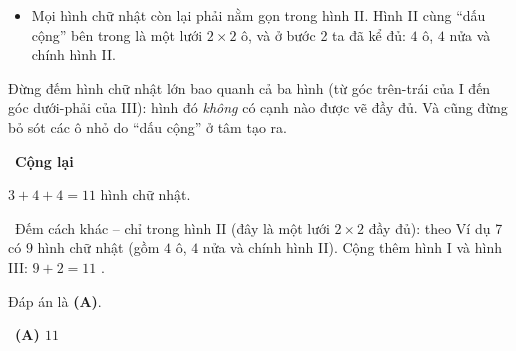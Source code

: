 \documentclass[11pt]{article}
\providecommand{\AnsWord}{Đáp số}
\newcommand{\ans}[1]{\par\smallskip{\bfseries\color{tmGreen!88!black}\AnsWord:}\ {\bfseries\color{AnsRed}#1}\par}
\newcommand{\step}[2]{\par\smallskip\noindent{\bfseries\color{tmBlue!85!black}\StepWord~#1.}\ {\bfseries #2}\par\nopagebreak}
\newcommand{\verify}[1]{\par\smallskip\noindent{\bfseries\color{tmGreen!80!black}\faCheckCircle\ \CheckWord}\ #1\par}
\def\AnsWord{Đáp số}
\def\StepWord{Bước}
\def\CheckWord{Thử lại:}
\begin{document}
{\begin{itemize}[leftmargin=1.2em,itemsep=1pt,topsep=1pt]
\item Mọi hình chữ nhật còn lại phải nằm gọn trong hình II. Hình II cùng ``dấu cộng'' bên trong là một lưới $2\times2$ ô, và ở bước 2 ta đã kể đủ: $4$ ô, $4$ nửa và chính hình II.
\end{itemize}
\begin{warnbox}Đừng đếm hình chữ nhật lớn bao quanh cả ba hình (từ góc trên-trái của I đến góc dưới-phải của III): hình đó \emph{không} có cạnh nào được vẽ đầy đủ. Và cũng đừng bỏ sót các ô nhỏ do ``dấu cộng'' ở tâm tạo ra.\end{warnbox}
\step{4}{Cộng lại}
$3+4+4=11$ hình chữ nhật.
\verify{Đếm cách khác -- chỉ trong hình II (đây là một lưới $2\times2$ đầy đủ): theo Ví dụ 7 có $9$ hình chữ nhật (gồm $4$ ô, $4$ nửa và chính hình II). Cộng thêm hình I và hình III: $9+2=11$ \checkmark.}
Đáp án là \textbf{(A)}.
\ans{(A) $11$}
}

\providecommand{\cpTooth}[3]{%
  \foreach \j in {0,...,#1}{\foreach \i in {1,...,#2}{
    \draw[tmOrange!85!black,line width=1.6pt,line cap=round]
      ({(\i-1)*#3+0.05},{\j*#3})--({\i*#3-0.05},{\j*#3});}}
  \foreach \j in {1,...,#1}{\foreach \i in {0,...,#2}{
    \draw[tmOrange!85!black,line width=1.6pt,line cap=round]
      ({\i*#3},{(\j-1)*#3+0.05})--({\i*#3},{\j*#3-0.05});}}}
\end{document}
